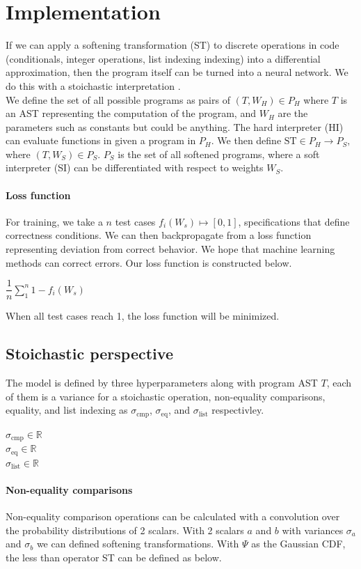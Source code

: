 \documentclass{article}
\begin{document}
\section*{Implementation}
If we can apply a softening transformation (ST) to discrete operations in code (conditionals, integer operations, list indexing indexing) into a differential approximation, then the program itself can be turned into a neural network. We do this with a stoichastic interpretation \cite{blondel2024elementsdifferentiableprogramming}.\\
We define the set of all possible programs as pairs of $(T, W_H) \in P_H$ where $T$ is an AST representing the computation of the program, and $W_H$ are the parameters such as constants but could be anything. The hard interpreter (HI) can evaluate functions in given a program in $P_H$. We then define $\text{ST} \in P_H \longrightarrow P_S,$ where $(T, W_S) \in P_S$. $P_S$ is the set of all softened programs, where a soft interpreter (SI) can be differentiated with respect to weights $W_S$.\\
\paragraph{Loss function} For training, we take a $n$ test cases $f_i(W_s) \mapsto [0, 1]$,  specifications that define correctness conditions. We can then backpropagate from a loss function representing deviation from correct behavior. We hope that machine learning methods can correct errors. Our loss function is constructed below.
\begin{center}
  $\dfrac{1}{n} \sum_1^n 1 - f_i(W_s)$
\end{center}
When all test cases reach 1, the loss function will be minimized.
\subsection*{Stoichastic perspective}
The model is defined by three hyperparameters along with program AST $T$, each of them is a variance for a stoichastic operation, non-equality comparisons, equality, and list indexing as $\sigma_{\text{cmp}}$, $\sigma_{\text{eq}}$, and $\sigma_{\text{list}}$ respectivley.
\begin{center}
  $\sigma_{\text{cmp}} \in \mathbb{R}$\\
  $\sigma_{\text{eq}} \in \mathbb{R}$\\
  $\sigma_{\text{list}} \in \mathbb{R}$
\end{center}
\paragraph{Non-equality comparisons} Non-equality comparison operations can be calculated with a convolution over the probability distributions of 2 scalars. With 2 scalars $a$ and $b$ with variances $\sigma_a$ and $\sigma_b$ we can defined softening transformations. With $\Psi$ as the Gaussian CDF, the less than operator ST can be defined as below.
\end{document}
